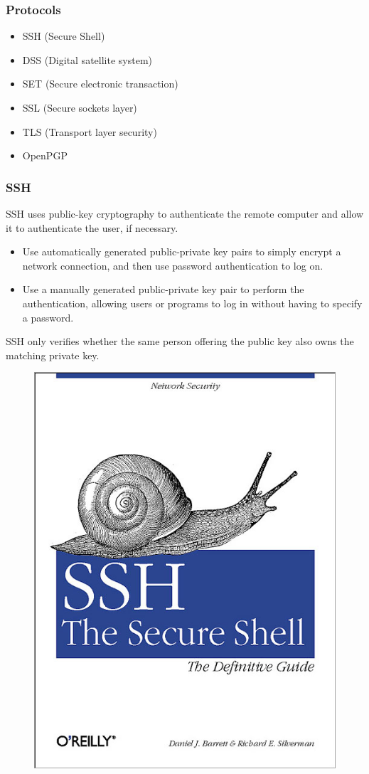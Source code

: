 \documentclass{beamer}
\begin{document}
\begin{frame}
\frametitle{Protocols}
\begin{itemize}
\item SSH (Secure Shell)
\item DSS (Digital satellite system)
\item SET (Secure electronic transaction)
\item SSL (Secure sockets layer) 
\item TLS (Transport layer security)
\item OpenPGP
\end{itemize}
\end{frame}

\begin{frame}
\frametitle{SSH}
SSH uses public-key cryptography to authenticate the remote computer and allow it to authenticate the user, if necessary.
\begin{itemize}
\item Use automatically generated public-private key pairs to simply encrypt a network connection, and then use password authentication to log on.
\item Use a manually generated public-private key pair to perform the authentication, allowing users or programs to log in without having to specify a password.
\end{itemize}
SSH only verifies whether the same person offering the public key also owns the matching private key.
\begin{figure}
\includegraphics[width=0.1\linewidth]{librossh.jpg}
\end{figure}
\end{frame}
\end{document}
